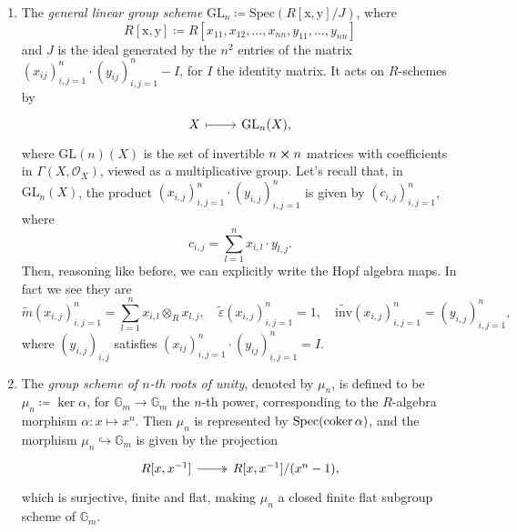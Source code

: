 \documentclass[../Main]{subfiles}
\begin{document}
\begin{ex}
\begin{enumerate}
		\item The {\em general linear group scheme} $\mathrm{GL}_n \coloneqq 
			\mathrm{Spec}(R[\mathrm{x},\mathrm{y}]/J)$,
			where
			\begin{equation}
				R[\mathrm{x},\mathrm{y}] \coloneqq
				R[x_{11}, x_{12}, \ldots, x_{nn},
				y_{11}, \ldots, y_{nn}]
			\end{equation} 
			and $J$ is the ideal generated by the $n^2$ entries of the matrix
			$\left( x_{ij} \right)_{i,j=1}^n \cdot \left( y_{ij} \right)_{i,j=1}^n - I$,
			for $I$ the identity matrix.
			It acts on $R$-schemes by
			\begin{equation}
			\begin{tikzcd}[row sep = 0ex
				,/tikz/column 1/.append style={anchor=base east}
				,/tikz/column 2/.append style={anchor=base west}]
				X \arrow[r, "", mapsto] & \mathrm{GL}_n(X)
			,\end{tikzcd}
			\end{equation} 
			where $\mathrm{GL}(n)(X)$ is the set of invertible $n \cross n$
			matrices with coefficients in $\Gamma \left( X , \mathcal{O}_{ X } \right)$,
			viewed as a multiplicative group.
			Let's recall that, in $\mathrm{GL}_n(X)$, the product
			$\left( x_{i,j} \right)_{i,j = 1}^n \cdot 
			\left( y_{i,j} \right)_{i,j = 1}^n$
			is given by $\left( c_{i,j} \right)_{i,j = 1}^n$, where
			\begin{equation}
			c_{i,j} = \sum_{l=1}^{n} x_{i,l} \cdot y_{l,j}
			.\end{equation} 
			Then, reasoning like before, we can explicitly write the Hopf algebra maps.
			In fact we see they are
			\begin{equation*}
				\widetilde{m}(x_{i,j})_{i,j=1}^n = \sum_{l=1}^{n} x_{i,l} \otimes_R x_{l,j},
				\quad
				\widetilde{\varepsilon}(x_{i,j})_{i,j=1}^n = 1,
				\quad
				\widetilde{\mathrm{inv}}(x_{i,j})_{i,j=1}^n = (y_{i,j})_{i,j=1}^n
			,\end{equation*} 
			where $\left( y_{i,j} \right)_{i,j}$ satisfies 
			$\left( x_{ij} \right)_{i,j=1}^n \cdot \left( y_{ij} \right)_{i,j=1}^n = I$.


		\item The {\em group scheme of $n$-th roots of unity}, denoted by $\mu_n$,
			is defined to be $\mu_n \coloneqq \ker \alpha$,
			for $\mathbb{G}_m \to \mathbb{G}_m$
			the $n$-th power, corresponding to the $R$-algebra morphism
			$\alpha\colon x \mapsto x^n$.
			Then $\mu_n$ is represented by $\mathrm{Spec}(\operatorname{coker} \alpha)$,
			and the morphism $\mu_n \hookrightarrow \mathbb{G}_m$ is given by the projection
			\begin{equation}
			\begin{tikzcd}
				R[x,x^{-1}] \arrow[r, "", twoheadrightarrow] &
				R[x,x^{-1}] / (x^n - 1)
			,\end{tikzcd}
			\end{equation}
			which is surjective, finite and flat, making $\mu_n$
			a closed finite flat subgroup scheme of $\mathbb{G}_m$.



\end{enumerate}
\end{ex}
\end{document}
